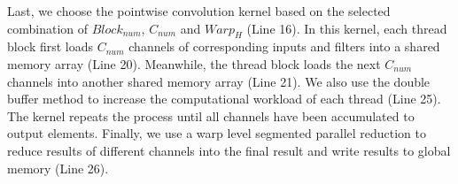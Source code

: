 Last, we choose the pointwise convolution kernel based on the selected combination of $Block_{num}$, $C_{num}$ and $Warp_H$ (Line 16).
In this kernel, each thread block first loads $C_{num}$ channels of corresponding inputs and filters into a shared memory array (Line 20).
Meanwhile, the thread block loads the next $C_{num}$ channels into another shared memory array (Line 21).
We also use the double buffer method to increase the computational workload of each thread (Line 25).
The kernel repeats the process until all channels have been accumulated to output elements.
Finally, we use a warp level segmented parallel reduction to reduce results of different channels into the final result and write results to global memory (Line 26).
